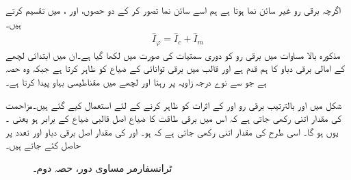  اگرچہ برقی رو  غیر سائن نما ہوتا ہے ہم  اسے سائن نما   تصور  کر کے  دو حصوں،  اور ، میں تقسیم کرتے ہیں۔
\begin{align}\label{مساوات_ٹرانسفارمر_رو_ہیجان_ضیاع_اجزاع}
\hat{I}_\varphi=\hat{I}_c+\hat{I}_m
\end{align}
مذکورہ بالا مساوات میں برقی رو کو دوری سمتیات کی صورت میں لکھا گیا ہے۔ان میں   ابتدائی لچھے کے امالی برقی دباو  کا ہم قدم ہے اور  قالب میں برقی توانائی کے ضیاع کو ظاہر کرتا ہے جبکہ   وہ حصہ ہے جو  سے نوے درجہ   زاویہ  پر رہتا اور  لچھے میں مقناطیسی بہاو پیدا کرتا ہے۔

شکل  میں   اور   بالترتیب برقی رو  اور  کے اثرات کو ظاہر کرنے کے لئے استعمال کیے گئے ہیں۔مزاحمت  کی مقدار اتنی رکھی جاتی ہے کہ اس میں برقی طاقت کا ضیاع اصل قالبی ضیاع کے برابر ہو یعنی ۔یوں   ہو گا۔ اسی طرح  کی مقدار اتنی رکھی جاتی ہے کہ  ہو۔  اور   کی مقدار اصل برقی دباو اور تعدد پر حاصل کئے جاتے ہیں۔ 

\begin{figure}
\centering
\caption{ٹرانسفارمر مساوی دور، حصہ دوم۔}
\label{شکل_ٹرانسفارمر_ماڈل_حصہ_دوم}
\end{figure}

